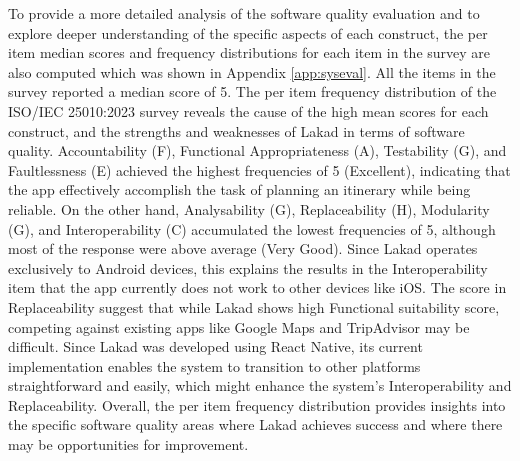 To provide a more detailed analysis of the software quality evaluation and to explore deeper understanding of the specific aspects of each construct, the per item median scores and frequency distributions for each item in the survey are also computed which was shown in Appendix \ref{app:syseval}. All the items in the survey reported a median score of 5. The per item frequency distribution of the ISO/IEC 25010:2023 survey reveals the cause of the high mean scores for each construct, and the strengths and weaknesses of Lakad in terms of software quality. Accountability (F), Functional Appropriateness (A), Testability (G), and Faultlessness (E) achieved the highest frequencies of 5 (Excellent), indicating that the app effectively accomplish the task of planning an itinerary while being reliable. On the other hand, Analysability (G), Replaceability (H), Modularity (G), and Interoperability (C) accumulated the lowest frequencies of 5, although most of the response were above average (Very Good). Since Lakad operates exclusively to Android devices, this explains the results in the Interoperability item that the app currently does not work to other devices like iOS. The score in Replaceability suggest that while Lakad shows high Functional suitability score, competing against existing apps like Google Maps and TripAdvisor may be difficult. Since Lakad was developed using React Native, its current implementation enables the system to transition to other platforms straightforward and easily, which might enhance the system’s Interoperability and Replaceability. Overall, the per item frequency distribution provides insights into the specific software quality areas where Lakad achieves success and where there may be opportunities for improvement.

